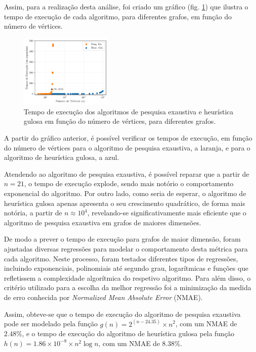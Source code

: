 \documentclass[mirror, portugues]{revdetua}
\begin{document}
Assim, para a realização desta análise, foi criado um gráfico (fig. \ref{fig:exectime}) que ilustra o tempo de execução de cada algoritmo, para diferentes grafos, em função do número de vértices.

\begin{figure}[h]
    \centering
    \includegraphics[width=0.4\textwidth]{../assets/execTIME.png}
    \caption{Tempo de execução dos algoritmos de pesquisa exaustiva e heurística gulosa em função do número de vértices, para diferentes grafos.}
    \label{fig:exectime}
\end{figure}

A partir do gráfico anterior, é possível verificar os tempos de execução, em função do número de vértices para o algoritmo de pesquisa exaustiva, a laranja, e para o algoritmo de heurística gulosa, a azul. 

Atendendo ao algoritmo de pesquisa exaustiva, é possível reparar que a partir de $n = 21$, o tempo de execução explode, sendo mais notório o comportamento exponencial do algoritmo. Por outro lado, como seria de esperar, o algoritmo de heurística gulosa apenas apresenta o seu crescimento quadrático, de forma mais notória, a partir de $n \approx 10^4$, revelando-se significativamente mais eficiente que o algoritmo de pesquisa exaustiva em grafos de maiores dimensões.

De modo a prever o tempo de execução para grafos de maior dimensão, foram ajustadas diversas regressões para modelar o comportamento desta métrica para cada algoritmo. Neste processo, foram testados diferentes tipos de regressões, incluindo exponenciais, polinomiais até segundo grau, logarítmicas e funções que refletissem a complexidade algorítmica do respetivo algoritmo. Para além disso, o critério utilizado para a escolha da melhor regressão foi a minimização da medida de erro conhecida por \textit{Normalized Mean Absolute Error} (NMAE).

Assim, obteve-se que o tempo de execução do algoritmo de pesquisa exaustiva pode ser modelado pela função $g(n) = 2^{(n - 24.35)} \times n^2$, com um NMAE de $2.48\%$, e o tempo de execução do algoritmo de heurística gulosa pela função $h(n) = 1.86 \times 10^{-8} \times n^2 \log n$, com um NMAE de $8.38\%$.
\end{document}

